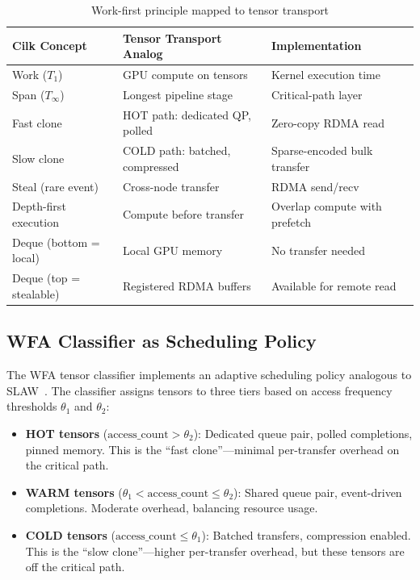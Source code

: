 \documentclass[11pt,letterpaper]{article}
\begin{document}
\begin{table}[htbp]
\centering
\caption{Work-first principle mapped to tensor transport}
\label{tab:analogy}
\begin{tabular}{@{}lll@{}}
\toprule
\textbf{Cilk Concept} & \textbf{Tensor Transport Analog} & \textbf{Implementation} \\
\midrule
Work ($T_1$) & GPU compute on tensors & Kernel execution time \\
Span ($T_\infty$) & Longest pipeline stage & Critical-path layer \\
Fast clone & HOT path: dedicated QP, polled & Zero-copy RDMA read \\
Slow clone & COLD path: batched, compressed & Sparse-encoded bulk transfer \\
Steal (rare event) & Cross-node transfer & RDMA send/recv \\
Depth-first execution & Compute before transfer & Overlap compute with prefetch \\
Deque (bottom = local) & Local GPU memory & No transfer needed \\
Deque (top = stealable) & Registered RDMA buffers & Available for remote read \\
\bottomrule
\end{tabular}
\end{table}

\subsection{WFA Classifier as Scheduling Policy}

The WFA tensor classifier implements an adaptive scheduling policy analogous to SLAW~\cite{guo2010slaw}. The classifier assigns tensors to three tiers based on access frequency thresholds $\theta_1$ and $\theta_2$:

\begin{itemize}
    \item \textbf{HOT tensors} ($\text{access\_count} > \theta_2$): Dedicated queue pair, polled completions, pinned memory. This is the ``fast clone''---minimal per-transfer overhead on the critical path.
    \item \textbf{WARM tensors} ($\theta_1 < \text{access\_count} \leq \theta_2$): Shared queue pair, event-driven completions. Moderate overhead, balancing resource usage.
    \item \textbf{COLD tensors} ($\text{access\_count} \leq \theta_1$): Batched transfers, compression enabled. This is the ``slow clone''---higher per-transfer overhead, but these tensors are off the critical path.
\end{itemize}
\end{document}
